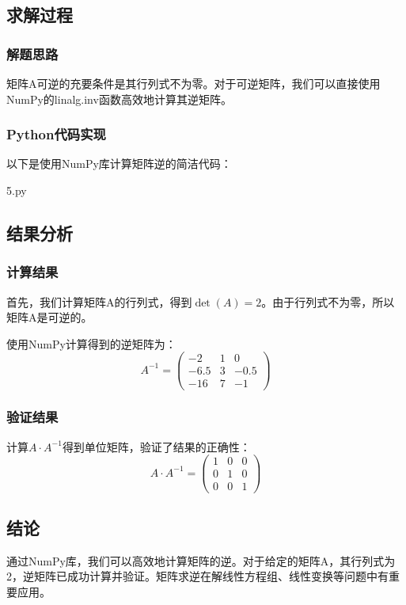 \documentclass[bwprint]{cumcmthesis}
\begin{document}
\subsection{求解过程}

\subsubsection{解题思路}
矩阵A可逆的充要条件是其行列式不为零。对于可逆矩阵，我们可以直接使用NumPy的linalg.inv函数高效地计算其逆矩阵。

\subsubsection{Python代码实现}
以下是使用NumPy库计算矩阵逆的简洁代码：

\noindent 5.py
    

\subsection{结果分析}

\subsubsection{计算结果}
首先，我们计算矩阵A的行列式，得到$\det(A) = 2$。由于行列式不为零，所以矩阵A是可逆的。

使用NumPy计算得到的逆矩阵为：
\begin{equation}
A^{-1} = \begin{pmatrix} 
-2 & 1 & 0 \\
-6.5 & 3 & -0.5 \\
-16 & 7 & -1
\end{pmatrix}
\end{equation}

\subsubsection{验证结果}
计算$A \cdot A^{-1}$得到单位矩阵，验证了结果的正确性：
\begin{equation}
A \cdot A^{-1} = \begin{pmatrix} 
1 & 0 & 0 \\
0 & 1 & 0 \\
0 & 0 & 1
\end{pmatrix}
\end{equation}

\subsection{结论}
通过NumPy库，我们可以高效地计算矩阵的逆。对于给定的矩阵A，其行列式为2，逆矩阵已成功计算并验证。矩阵求逆在解线性方程组、线性变换等问题中有重要应用。
\end{document}
